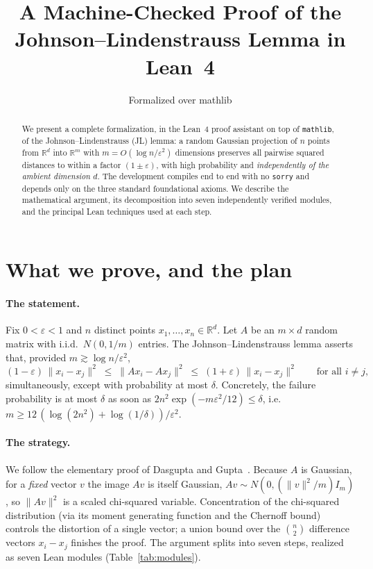 \documentclass[11pt]{article}
\title{\textbf{A Machine-Checked Proof of the\\ Johnson--Lindenstrauss Lemma in Lean~4}}
\author{Formalized over mathlib}
\date{}
\theoremstyle{remark}
\newcommand{\R}{\mathbb{R}}
\newcommand{\eps}{\varepsilon}
\newcommand{\norm}[1]{\lVert #1 \rVert}
\begin{document}
\maketitle

\begin{abstract}
We present a complete formalization, in the Lean~4 proof assistant on top of
\texttt{mathlib}, of the Johnson--Lindenstrauss (JL) lemma: a random Gaussian projection
of $n$ points from $\R^d$ into $\R^m$ with $m = O(\log n / \eps^2)$ dimensions preserves
all pairwise squared distances to within a factor $(1\pm\eps)$, with high probability and
\emph{independently of the ambient dimension $d$}. The development compiles end to end
with no \texttt{sorry} and depends only on the three standard foundational axioms. We
describe the mathematical argument, its decomposition into seven independently verified
modules, and the principal Lean techniques used at each step.
\end{abstract}

\section{What we prove, and the plan}

\paragraph{The statement.} Fix $0<\eps<1$ and $n$ distinct points $x_1,\dots,x_n\in\R^d$.
Let $A$ be an $m\times d$ random matrix with i.i.d.\ $N(0,1/m)$ entries. The
Johnson--Lindenstrauss lemma asserts that, provided $m \gtrsim \log n / \eps^2$,
\[
  (1-\eps)\,\norm{x_i-x_j}^2 \;\le\; \norm{A x_i - A x_j}^2 \;\le\; (1+\eps)\,\norm{x_i-x_j}^2
  \qquad\text{for all } i\ne j,
\]
simultaneously, except with probability at most $\delta$. Concretely, the failure
probability is at most $\delta$ as soon as $2n^2\exp(-m\eps^2/12)\le\delta$, i.e.
$m\ge 12\,(\log(2n^2)+\log(1/\delta))/\eps^2$.

\paragraph{The strategy.} We follow the elementary proof of Dasgupta and
Gupta~\cite{dasgupta}. Because $A$ is Gaussian, for a \emph{fixed} vector $v$ the image
$Av$ is itself Gaussian, $Av\sim N(0,(\norm{v}^2/m)I_m)$, so $\norm{Av}^2$ is a scaled
chi-squared variable. Concentration of the chi-squared distribution (via its moment
generating function and the Chernoff bound) controls the distortion of a single vector;
a union bound over the $\binom n2$ difference vectors $x_i-x_j$ finishes the proof. The
argument splits into seven steps, realized as seven Lean modules
(Table~\ref{tab:modules}).
\end{document}
